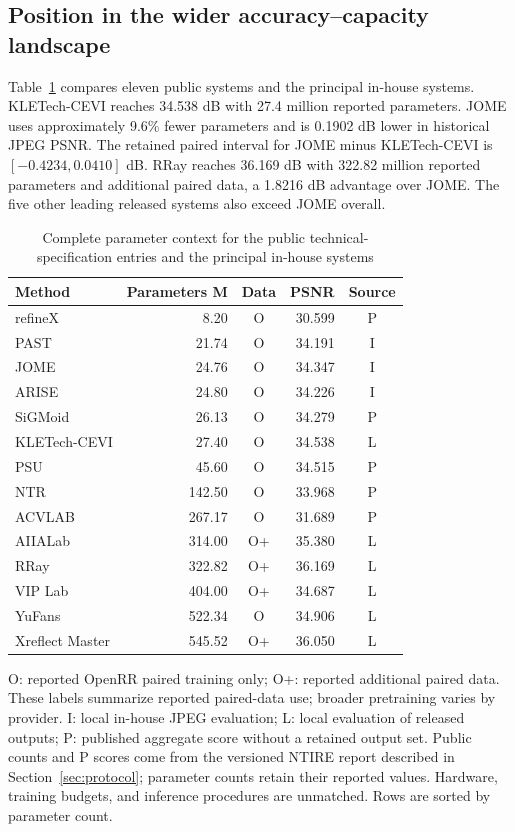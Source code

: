\documentclass[12pt]{article}
\newcommand{\tabnote}[1]{\par\vspace{5pt}\noindent #1}
\begin{document}
\subsection{Position in the wider accuracy--capacity landscape}
Table~\ref{tab:capacity} compares eleven public systems and the principal in-house systems. KLETech-CEVI reaches 34.538 dB with 27.4 million reported parameters. JOME uses approximately 9.6\% fewer parameters and is 0.1902 dB lower in historical JPEG PSNR. The retained paired interval for JOME minus KLETech-CEVI is $[-0.4234,0.0410]$ dB. RRay reaches 36.169 dB with 322.82 million reported parameters and additional paired data, a 1.8216 dB advantage over JOME. The five other leading released systems also exceed JOME overall.
\begin{table}[t]
\caption{Complete parameter context for the public technical-specification entries and the principal in-house systems}
\label{tab:capacity}
\begin{tabularx}{\linewidth}{@{}Xrcr c@{}}
\toprule
Method & Parameters M & Data & PSNR & Source\\
\midrule
refineX & 8.20 & O & 30.599 & P \\
PAST & 21.74 & O & 34.191 & I \\
JOME & 24.76 & O & 34.347 & I \\
ARISE & 24.80 & O & 34.226 & I \\
SiGMoid & 26.13 & O & 34.279 & P \\
KLETech-CEVI & 27.40 & O & 34.538 & L \\
PSU & 45.60 & O & 34.515 & P \\
NTR & 142.50 & O & 33.968 & P \\
ACVLAB & 267.17 & O & 31.689 & P \\
AIIALab & 314.00 & O+ & 35.380 & L \\
RRay & 322.82 & O+ & 36.169 & L \\
VIP Lab & 404.00 & O+ & 34.687 & L \\
YuFans & 522.34 & O & 34.906 & L \\
Xreflect Master & 545.52 & O+ & 36.050 & L \\
\bottomrule
\end{tabularx}
\tabnote{O: reported OpenRR paired training only; O+: reported additional paired data. These labels summarize reported paired-data use; broader pretraining varies by provider. I: local in-house JPEG evaluation; L: local evaluation of released outputs; P: published aggregate score without a retained output set. Public counts and P scores come from the versioned NTIRE report described in Section~\ref{sec:protocol}; parameter counts retain their reported values. Hardware, training budgets, and inference procedures are unmatched. Rows are sorted by parameter count.}
\end{table}
\end{document}
